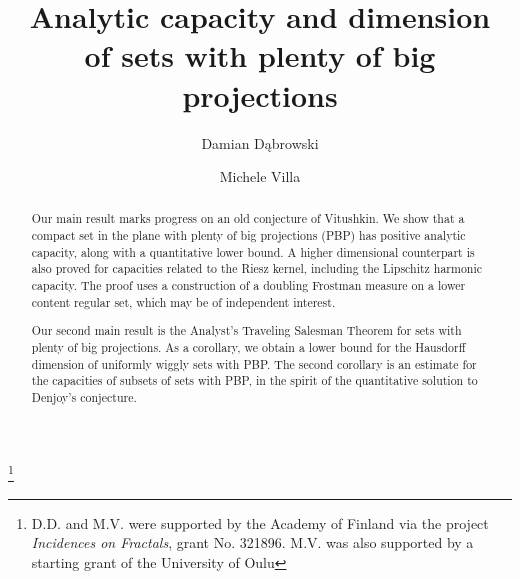 \documentclass[11pt,reqno]{amsart}
\theoremstyle{definition}
\theoremstyle{remark}
\numberwithin{equation}{section}
\theoremstyle{theorem}
\theoremstyle{definition}
\theoremstyle{remark}
\numberwithin{equation}{section}
\begin{document}
	\title[Analytic capacity and dimension of sets with PBP]{Analytic capacity and dimension\\ of sets with plenty of big projections}	
	
	\author[D. D\k{a}browski]{Damian D\k{a}browski}
	\address{Damian D\k{a}browski, University of Jyväskylä, P.O. Box 35 (MaD), 40014, Finland}	
	
	\author[M. Villa]{Michele Villa}
	\address{Michele Villa, Research Unit of Mathematical Sciences, University of Oulu, P.O. Box 8000, FI-90014, University of Oulu, Finland}
	
	
	\thanks{D.D. and M.V. were supported by the Academy of Finland via the project \textit{Incidences on Fractals}, grant No. 321896. M.V. was also supported by a starting grant of the University of Oulu}
	

		\begin{abstract}
		Our main result marks progress on an old conjecture of Vitushkin. We show that a compact set in the plane with plenty of big projections (PBP) has positive analytic capacity, along with a quantitative lower bound. A higher dimensional counterpart is also proved for capacities related to the Riesz kernel, including the Lipschitz harmonic capacity. The proof uses a construction of a doubling Frostman measure on a lower content regular set, which may be of independent interest.
		
		Our second main result is the Analyst's Traveling Salesman Theorem for sets with plenty of big projections. As a corollary, we obtain a lower bound for the Hausdorff dimension of uniformly wiggly sets with PBP. The second corollary is an estimate for the capacities of subsets of sets with PBP, in the spirit of the quantitative solution to Denjoy's conjecture. 

	\end{abstract}

	\maketitle
	
	\tableofcontents
	
\end{document}
